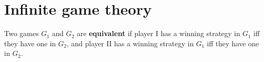 \documentclass[../main]{subfiles}
\begin{document}
\chapter{Infinite game theory}
\label{apx.games}
\thispagestyle{fancy}

\lipsum[1]

Two games $G_1$ and $G_2$ are \textbf{equivalent} if player I has a winning strategy in $G_1$ iff they have one in $G_2$, and player II has a winning strategy in $G_1$ iff they have one in $G_2$. 
\end{document}
